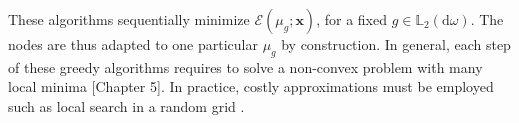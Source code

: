 \documentclass[twoside,11pt]{book}
\numberwithin{theorem}{chapter}
\numberwithin{definition}{chapter}
\numberwithin{proposition}{chapter}
\numberwithin{corollary}{chapter}
\numberwithin{example}{chapter}
\numberwithin{lemma}{chapter}
\numberwithin{assumption}{chapter}
\numberwithin{equation}{chapter}
\numberwithin{figure}{chapter}
\DeclareMathOperator{\F}{\mathcal{F}}
\DeclareMathOperator{\X}{\mathcal{X}}
\def\Ltwo{\mathbb{L}_{2}(\mathrm{d} \omega)}
\newcommand{\pc}[1]{\textcolor{blue}{#1}}
\begin{document}
These algorithms sequentially minimize $\mathcal{E}(\mu_{g}; \bm{x})$, for a fixed $g \in \Ltwo$. The nodes are thus adapted to one particular $\mu_{g}$ by construction.
%
In general, each step of these greedy algorithms requires to solve a non-convex problem with many local minima \parencite{Oett17}[Chapter 5]. In practice, costly approximations must be employed such as local search in a random grid \parencite{LaLiBa15}.%

\end{document}
